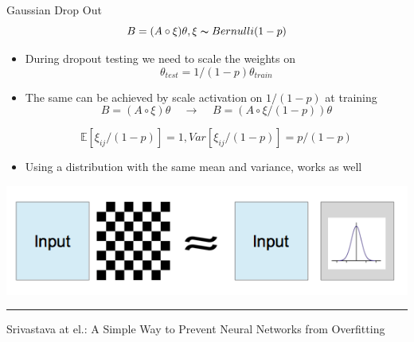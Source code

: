 \documentclass{beamer}
\begin{document}
\begin{frame}{Gaussian  Drop Out}
	$$B = (A \circ \xi) \theta, \xi \thicksim Bernulli(1-p)$$
			
	\begin{itemize}
		\item During dropout testing we need to scale the weights on $$\theta_{test} = 1/(1 - p)\theta_{train}$$
		
		\item The same can be achieved by scale activation on $1/(1 - p)$ at training
			$$B = (A \circ \xi) \theta~~~~~\rightarrow~~~~~B = (A \circ \xi/(1-p))  \theta$$ 
			
			$$\mathds{E}[\xi_{ij}/(1-p)] = 1, Var[\xi_{ij}/(1-p)] = p/(1-p)$$
		
		\item Using a distribution with the same mean and variance, works as well
	\end{itemize}
	
	\begin{center}
		\includegraphics[scale=0.4]{img/gaus}
	\end{center}
	
	\vspace{-0.2cm}
	
	
	\noindent\rule{12cm}{0.4pt}
	\footnotesize{Srivastava at el.: A Simple Way to Prevent Neural Networks from Overfitting}

\end{frame}
	
\end{document}

